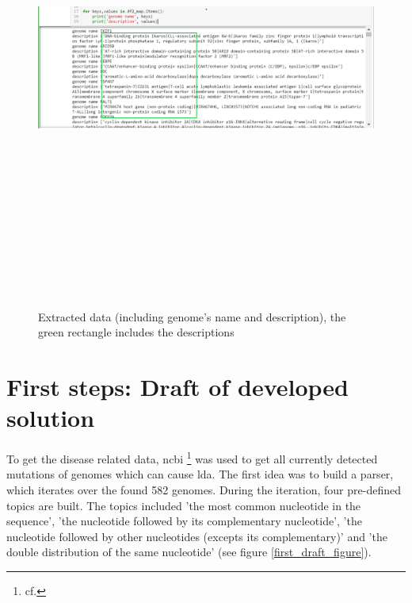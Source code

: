 \begin{figure}[htbp]
	\centering
	\includegraphics[width=1\textwidth, height=600px, keepaspectratio]{Image/gene_description.png}
	\caption{Extracted data (including genome's name and description), the green rectangle includes the descriptions}
	\label{gene_description_figure}
\end{figure}

\section{First steps: Draft of developed solution}\label{draft}

To get the disease related data, \ac{ncbi} \footnote{cf.\autocite{ncbi}} was used to get all currently detected mutations of genomes which can cause \ac{lda}.
The first idea was to build a parser, which iterates over the found 582 genomes.
During the iteration, four pre-defined topics are built. The topics included 'the most common nucleotide in the sequence', 'the nucleotide followed by its complementary nucleotide', 'the nucleotide followed by other nucleotides (excepts its complementary)' and 'the double distribution of the same nucleotide' (see figure \ref{first_draft_figure}).


